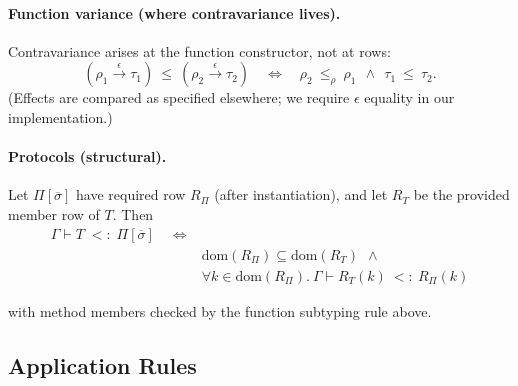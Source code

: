 \paragraph{Function variance (where contravariance lives).}
Contravariance arises at the function constructor, not at rows:
\[
(\rho_1 \xrightarrow{\epsilon} \tau_1)\ \le\ (\rho_2 \xrightarrow{\epsilon} \tau_2)
\quad\iff\quad
\rho_2\ \le_\rho\ \rho_1\ \ \wedge\ \ \tau_1\ \le\ \tau_2.
\]
(Effects are compared as specified elsewhere; we require $\epsilon$ equality in our implementation.)

\paragraph{Protocols (structural).}
Let $\Pi[\overline{\sigma}]$ have required row $R_\Pi$ (after instantiation), and let $R_T$ be the provided member row of $T$.
Then
\begin{align*}
\Gamma \vdash T \;<:\; \Pi[\overline{\sigma}] \quad\iff & \\
& \mathrm{dom}(R_\Pi)\subseteq \mathrm{dom}(R_T)\ \ \wedge \\
& \forall k\in\mathrm{dom}(R_\Pi).\ \Gamma \vdash R_T(k)\ <: \ R_\Pi(k)
\end{align*}

with method members checked by the function subtyping rule above.

\subsection{Application Rules}

